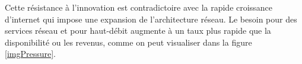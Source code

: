 






Cette résistance à l'innovation est contradictoire avec la rapide croissance d'internet qui impose une expansion de l'architecture réseau. 
Le besoin pour des services réseau et pour haut-débit augmente à un taux plus rapide que la disponibilité ou les revenus, comme on peut visualiser dans la figure \ref{imgPressure}.


